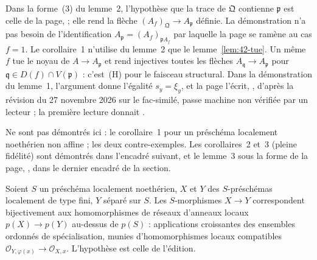 \begin{remarque}
Dans la forme~(3) du lemme~2, l'hypothèse que la trace de $\mathfrak Q$ contienne $\mathfrak p$ est celle de la page,  ; elle rend la flèche $(A_f)_{\mathfrak Q} \to A_{\mathfrak p}$ définie. La démonstration n'a pas besoin de l'identification $A_{\mathfrak p} = (A_f)_{\mathfrak p A_f}$ par laquelle la page se ramène au cas $f = 1$. Le corollaire~1 n'utilise du lemme~2 que le lemme~\ref{lem:42-tue}. Un même $f$ tue le noyau de $A \to A_{\mathfrak p}$ et rend injectives toutes les flèches $A_{\mathfrak q} \to A_{\mathfrak p}$ pour $\mathfrak q \in D(f) \cap V(\mathfrak p)$ : c'est~(H) pour le faisceau structural. Dans la démonstration du lemme~1, l'argument donne l'égalité $s_y = \xi_y$, et la page l'écrit, , d'après la révision du 27 novembre 2026 sur le fac-similé, passe machine non vérifiée par un lecteur ; la première lecture donnait .
\end{remarque}

Ne sont pas démontrés ici : le corollaire~1 pour un préschéma localement noethérien non affine ; les deux contre-exemples. Les corollaires~2 et~3 (pleine fidélité) sont démontrés dans l'encadré suivant, et le lemme~3 sous la forme de la page, , dans le dernier encadré de la section.

\begin{encadre}
\begin{theoreme*}
Soient $S$ un préschéma localement noethérien, $X$ et $Y$ des $S$-préschémas localement de type fini, $Y$ séparé sur $S$. Les $S$-morphismes $X \to Y$ correspondent bijectivement aux homomorphismes de réseaux d'anneaux locaux $p(X) \to p(Y)$ au-dessus de $p(S)$ : applications croissantes des ensembles ordonnés de spécialisation, munies d'homomorphismes locaux compatibles $\mathcal O_{Y,\varphi(x)} \to \mathcal O_{X,x}$. L'hypothèse  est celle de l'édition.
\end{theoreme*}
\end{encadre}


